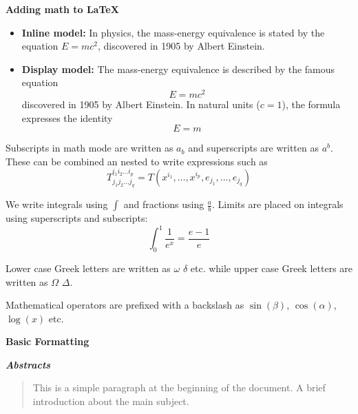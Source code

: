 \documentclass[12pt, letterpaper]{article}
\begin{document}
\textbf{Adding math to LaTeX}

\begin{itemize}
	\item \textbf{Inline model:}
	In physics, the mass-energy equivalence is stated by the equation $E=mc^2$, discovered in 1905 by Albert Einstein.
	
	\item \textbf{Display model:} 
	The mass-energy equivalence is described by the famous equation
	$$E=mc^2$$
	discovered in 1905 by Albert Einstein. In natural units ($c = 1$), the formula expresses the identity
	\begin{equation}
		E=m
	\end{equation}
\end{itemize}

Subscripts in math mode are written as $a_b$ and superscripts are written as $a^b$.
These can be combined an nested to write expressions such as
$$T^{i_1 i_2 \dots i_p}_{j_1 j_2 \dots j_q} =
T(x^{i_1},\dots,x^{i_p},e_{j_1},\dots,e_{j_q})$$

We write integrals using $\int$ and fractions using $\frac{a}{b}$. Limits are placed on integrals using superscripts and subscripts:
$$\int_0^1 \frac{1}{e^x} = \frac{e-1}{e}$$

Lower case Greek letters are written as $\omega$ $\delta$ etc. while upper case Greek letters are written as $\Omega$ $\Delta$.

Mathematical operators are prefixed with a backslash as $\sin(\beta)$, $\cos(\alpha)$, $\log(x)$ etc.

\textbf{Basic Formatting}

\textbf{\textit{Abstracts}}
\begin{abstract}
This is a simple paragraph at the beginning of the document. A brief introduction about the main subject.
\end{abstract}
\end{document}
